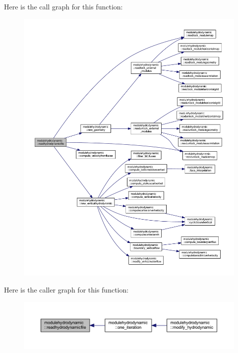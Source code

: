 Here is the call graph for this function\+:\nopagebreak
\begin{figure}[H]
\begin{center}
\leavevmode
\includegraphics[width=350pt]{namespacemodulehydrodynamic_a2b422929c9c1ce1f75858893e788082f_cgraph}
\end{center}
\end{figure}
Here is the caller graph for this function\+:\nopagebreak
\begin{figure}[H]
\begin{center}
\leavevmode
\includegraphics[width=350pt]{namespacemodulehydrodynamic_a2b422929c9c1ce1f75858893e788082f_icgraph}
\end{center}
\end{figure}
\mbox{\label{namespacemodulehydrodynamic_aeb9df81c7e232565cec18de1a51923d0}} 
